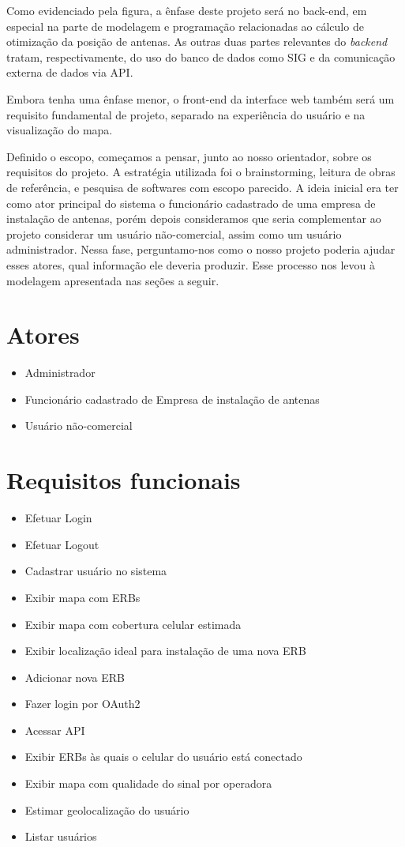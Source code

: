 \documentclass[]{politex}
\begin{document}
Como evidenciado pela figura, a ênfase deste projeto será no back-end, em
especial na parte de modelagem e programação relacionadas ao cálculo de
otimização da posição de antenas. As outras duas partes relevantes do 
\emph{backend} tratam, respectivamente, do uso do banco de dados como SIG e da
comunicação externa de dados via API.

Embora tenha uma ênfase menor, o front-end da interface web também será
um requisito fundamental de projeto, separado na experiência do usuário e na
visualização do mapa.

Definido o escopo, começamos a pensar, junto ao nosso orientador, sobre os 
requisitos do projeto. A estratégia utilizada foi o brainstorming, leitura de 
obras de referência, e pesquisa de softwares com escopo parecido.
A ideia inicial era ter como ator principal do sistema o funcionário cadastrado
de uma empresa de instalação de antenas, porém depois consideramos que seria
complementar ao projeto considerar um usuário não-comercial, assim
como um usuário administrador. Nessa fase, perguntamo-nos como o nosso projeto
poderia ajudar esses atores, qual informação ele deveria produzir. Esse processo
nos levou à modelagem apresentada nas seções a seguir.

\section{Atores}
\begin{itemize}
\item Administrador
\item Funcionário cadastrado de Empresa de instalação de antenas
\item Usuário não-comercial
\end{itemize}

\section{Requisitos funcionais}
\begin{itemize}
\item Efetuar Login
\item Efetuar Logout
\item Cadastrar usuário no sistema
\item Exibir mapa com ERBs
\item Exibir mapa com cobertura celular estimada
\item Exibir localização ideal para instalação de uma nova ERB
\item Adicionar nova ERB
\item Fazer login por OAuth2
\item Acessar API
\item Exibir ERBs às quais o celular do usuário está conectado
\item Exibir mapa com qualidade do sinal por operadora
\item Estimar geolocalização do usuário
\item Listar usuários
\end{itemize}
\end{document}
